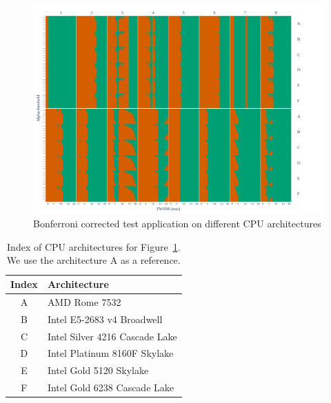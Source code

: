 \documentclass{article}
\begin{document}
\begin{figure}
    \centering
    \includegraphics[width=\linewidth]{figures/arch/arch_mct_fwe_bonferroni_.pdf}
    \caption{Bonferroni corrected test application on different CPU architectures}
    \label{fig:arch_bonferroni}
\end{figure}

\begin{table}
    \begin{center}
        \begin{tabular}{c|l}
            Index & Architecture                   \\
            \hline
            A     & AMD Rome 7532                  \\
            B     & Intel E5-2683 v4 Broadwell     \\
            C     & Intel Silver 4216 Cascade Lake \\
            D     & Intel Platinum 8160F Skylake   \\
            E     & Intel Gold 5120 Skylake        \\
            F     & Intel Gold 6238 Cascade Lake
        \end{tabular}
    \end{center}
    \caption{Index of CPU architectures for Figure~\ref{fig:arch_bonferroni}. We use the architecture A as a reference.}
    \label{tab:index-arch-map}
\end{table}
\end{document}
